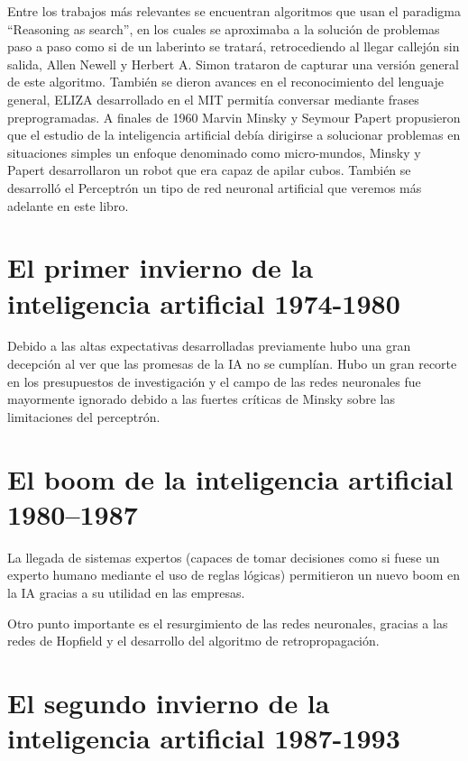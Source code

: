 \documentclass[11pt,fleqn]{book} %
\begin{document}
Entre los trabajos más relevantes se encuentran algoritmos que usan el paradigma “Reasoning as search”, en los cuales se aproximaba a la solución de problemas paso a paso como si de un laberinto se tratará, retrocediendo al llegar callejón sin salida, Allen Newell y Herbert A. Simon trataron de capturar una versión general de este algoritmo. También se dieron avances en el reconocimiento del lenguaje general, ELIZA desarrollado en el MIT permitía conversar mediante frases preprogramadas. A finales de 1960 Marvin Minsky y Seymour Papert propusieron que el estudio de la inteligencia artificial debía dirigirse a solucionar problemas en situaciones simples un enfoque denominado como micro-mundos, Minsky y Papert desarrollaron un robot que era capaz de apilar cubos. También se desarrolló el Perceptrón un tipo de red neuronal artificial que veremos más adelante en este libro.

\section{El primer invierno de la inteligencia artificial 1974-1980} 

Debido a las altas expectativas desarrolladas previamente hubo una gran decepción al ver que las promesas de la IA no se cumplían. Hubo un gran recorte en los presupuestos de investigación y el campo de las redes neuronales fue mayormente ignorado debido a las fuertes críticas de Minsky sobre las limitaciones del perceptrón.

\section{El boom de la inteligencia artificial 1980–1987} 

La llegada de sistemas expertos (capaces de tomar decisiones como si fuese un experto humano mediante el uso de reglas lógicas) permitieron un nuevo boom en la IA gracias a su utilidad en las empresas.

Otro punto importante es el resurgimiento de las redes neuronales, gracias a las redes de Hopfield y el desarrollo del algoritmo de retropropagación.

\section{El segundo invierno de la inteligencia artificial 1987-1993} 
\end{document}
